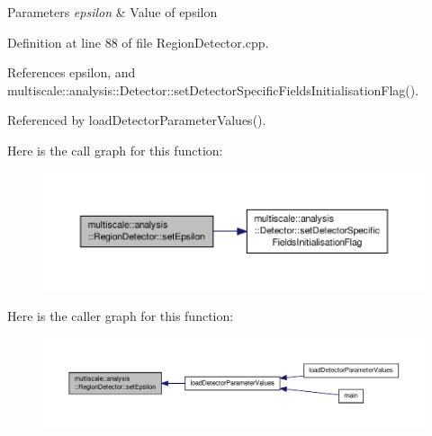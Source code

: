 \begin{DoxyParams}{Parameters}
{\em epsilon} & Value of epsilon \\
\hline
\end{DoxyParams}


Definition at line 88 of file Region\-Detector.\-cpp.



References epsilon, and multiscale\-::analysis\-::\-Detector\-::set\-Detector\-Specific\-Fields\-Initialisation\-Flag().



Referenced by load\-Detector\-Parameter\-Values().



Here is the call graph for this function\-:
\nopagebreak
\begin{figure}[H]
\begin{center}
\leavevmode
\includegraphics[width=350pt]{classmultiscale_1_1analysis_1_1RegionDetector_a069ed208d5ff16e6caa0deb4ff21858b_cgraph}
\end{center}
\end{figure}




Here is the caller graph for this function\-:
\nopagebreak
\begin{figure}[H]
\begin{center}
\leavevmode
\includegraphics[width=350pt]{classmultiscale_1_1analysis_1_1RegionDetector_a069ed208d5ff16e6caa0deb4ff21858b_icgraph}
\end{center}
\end{figure}


